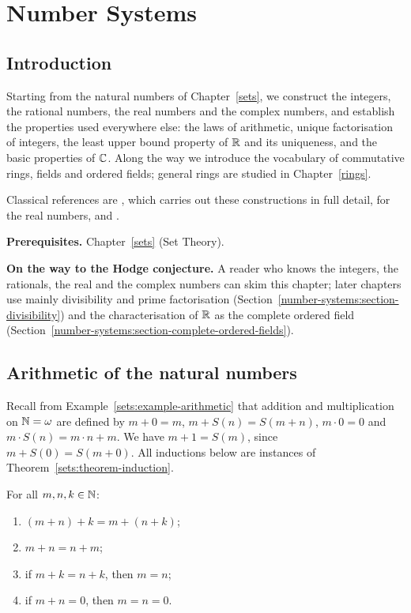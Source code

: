 \chapter{Number Systems}\label{number-systems}

\section{Introduction}\label{number-systems:section-introduction}

Starting from the natural numbers of Chapter~\ref{sets}, we construct the
integers, the rational numbers, the real numbers and the complex numbers, and
establish the properties used everywhere else: the laws of arithmetic, unique
factorisation of integers, the least upper bound property of $\mathbb{R}$ and its
uniqueness, and the basic properties of $\mathbb{C}$. Along the way we introduce the
vocabulary of commutative rings, fields and ordered fields; general rings are
studied in Chapter~\ref{rings}.

Classical references are \cite{landau-grundlagen}, which carries out these
constructions in full detail, \cite{dedekind-1872} for the real numbers, and
\cite[Chapter 1]{rudin-principles}.

\noindent\textbf{Prerequisites.} Chapter~\ref{sets} (Set Theory).

\noindent\textbf{On the way to the Hodge conjecture.} A reader who knows the integers, the rationals, the real and the complex numbers can skim this chapter; later chapters use mainly
divisibility and prime factorisation (Section~\ref{number-systems:section-divisibility}) and the characterisation of $\mathbb{R}$ as the complete ordered field (Section~\ref{number-systems:section-complete-ordered-fields}).

\section{Arithmetic of the natural numbers}\label{number-systems:section-natural-numbers}

Recall from Example~\ref{sets:example-arithmetic} that addition and
multiplication on $\mathbb{N} = \omega$ are defined by $m + 0 = m$,
$m + S(n) = S(m + n)$, $m \cdot 0 = 0$ and $m \cdot S(n) = m \cdot n + m$. We have
$m + 1 = S(m)$, since $m + S(0) = S(m + 0)$. All inductions below are instances of
Theorem~\ref{sets:theorem-induction}.

\begin{proposition}\label{number-systems:proposition-addition}
For all $m, n, k \in \mathbb{N}$:
\begin{enumerate}
\item $(m + n) + k = m + (n + k)$;
\item $m + n = n + m$;
\item if $m + k = n + k$, then $m = n$;
\item if $m + n = 0$, then $m = n = 0$.
\end{enumerate}
\end{proposition}

